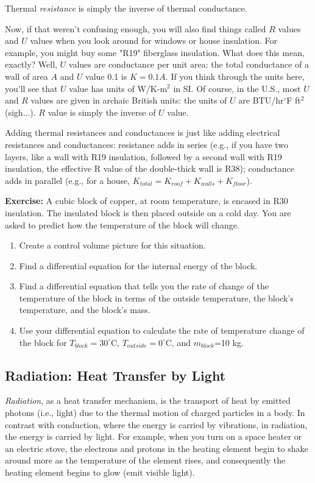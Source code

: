 Thermal {\it resistance} is simply the inverse of thermal conductance.  

Now, if that weren't confusing enough, you will also find things called $R$ values and $U$ values when you look around for windows or house insulation.  For example, you might buy some "R19" fiberglass insulation.  What does this mean, exactly?  Well, $U$ values are conductance per unit area:  the total conductance of a wall of area $A$ and $U$ value 0.1 is $K = 0.1 A$.  If you think through the units here, you'll see that $U$ value has units of W/K-m$^2$ in SI.  Of course, in the U.S., most $U$ and $R$ values are given in archaic British units:  the units of $U$ are BTU/hr$^{\circ}$F ft$^2$ (sigh...).  $R$ value is simply the inverse of $U$ value.

Adding thermal resistances and conductances is just like adding electrical resistances and conductances:  resistance adds in series (e.g., if you have two layers, like a wall with R19 insulation, followed by a second wall with R19 insulation, the effective R value of the double-thick wall is R38); conductance adds in parallel (e.g., for a house, $K_{total} = K_{roof} + K_{walls} + K_{floor}$).

{\bf Exercise:}  A cubic block of copper, at room temperature, is encased in R30 insulation.  The insulated block is then placed outside on a cold day.  You are asked to predict how the temperature of the block will change.
\begin{enumerate}
\item Create a control volume picture for this situation.
\item Find a differential equation for the internal energy of the block.
\item Find a differential equation that tells you the rate of change of the temperature of the block in terms of the outside temperature, the block's temperature, and the block's mass. 
\item Use your differential equation to calculate the rate of temperature change of the block for $T_{block} = 30 ^{\circ}$C, $T_{outside}=0  ^{\circ}$C, and $m_{block}$=10 kg. 
\end{enumerate}

 
\subsection{Radiation: Heat Transfer by Light}

{\it Radiation}, as a heat transfer mechanism, is the transport of heat by emitted photons (i.e., light) due to the thermal motion of charged particles in a body.  In contrast with conduction, where the energy is carried by vibrations, in radiation, the energy is carried by light.  For example, when you turn on a space heater or an electric stove, the electrons and protons in the heating element begin to shake around more as the temperature of the element rises, and consequently the heating element begins to glow (emit visible light).

